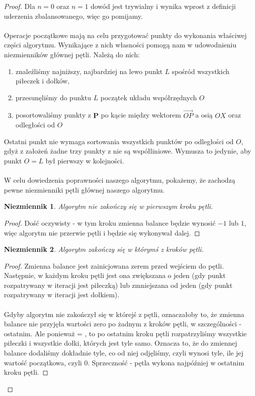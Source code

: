 \documentclass[10pt,a4paper]{article}
\newtheorem{invariant}{Niezmiennik}
\begin{document}
	\begin{proof}
		Dla $n = 0$ oraz $n = 1$ dowód jest trywialny i wynika wprost z definicji uderzenia zbalansowanego, więc go pomijamy. \\~\\
		Operacje początkowe mają na celu przygotować punkty do wykonania właściwej części algorytmu. Wynikające z nich własności pomogą nam w udowodnieniu niezmienników głównej pętli. Należą do nich:
		\begin{enumerate}
			\item znaleźliśmy najniższy, najbardziej na lewo punkt $L$ spośród wszystkich piłeczek i dołków, 
			\item przesunęliśmy do punktu $L$ początek układu współrzędnych $O$
			\item posortowaliśmy punkty z $\mathbf{P}$ po kącie między wektorem $\overrightarrow{OP}$ a osią $OX$ oraz odległości od $O$
		\end{enumerate}
		Ostatni punkt nie wymaga sortowania wszystkich punktów po odległości od $O$, gdyż z założeń żadne trzy punkty z nie są współliniowe. Wymusza to jedynie, aby punkt $O = L$ był pierwszy w kolejności. \\~\\
		W celu dowiedzenia poprawności naszego algorytmu, pokażemy, że zachodzą pewne niezmienniki pętli głównej naszego algorytmu.

		\begin{invariant} \label{invariant:1}
			Algorytm nie zakończy się w pierwszym kroku pętli.
		\end{invariant}

		\begin{proof}
			Dość oczywisty - w tym kroku zmienna balance będzie wynosić $-1$ lub $1$, więc algorytm nie przerwie pętli i będzie się wykonywał dalej. 
		\end{proof}

		\begin{invariant} \label{invariant:2}
			Algorytm zakończy się w którymś z kroków pętli.
		\end{invariant}

		\begin{proof}
			Zmienna balance jest zainicjowana zerem przed wejściem do pętli. Następnie, w każdym kroku pętli jest ona zwiększana o jeden (gdy punkt rozpatrywany w iteracji jest piłeczką) lub zmniejszana od jeden (gdy punkt rozpatrywany w iteracji jest dołkiem). \\~\\
			Gdyby algorytm nie zakończył się w którejś z pętli, oznaczałoby to, że zmienna balance nie przyjęła wartości zero po żadnym z kroków pętli, w szczególności - ostatnim. Ale ponieważ  = , to po ostatnim kroku pętli rozpatrzyliśmy wszystkie piłeczki i wszystkie dołki, których jest tyle samo. Oznacza to, że do zmiennej balance dodaliśmy dokładnie tyle, co od niej odjęliśmy, czyli wynosi tyle, ile jej wartość początkowa, czyli $0$. Sprzeczność - pętla wykona najpóźniej w ostatnim kroku pętli. 
		\end{proof}


\end{proof}
\end{document}

